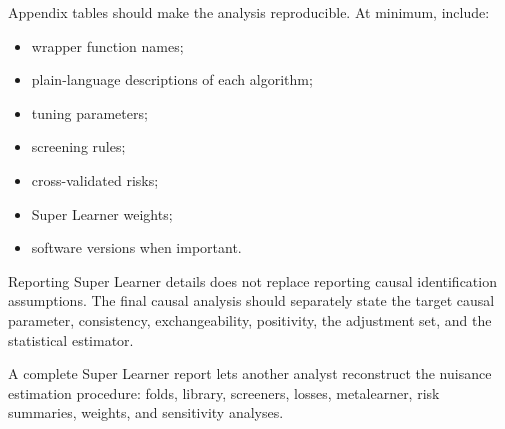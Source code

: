 Appendix tables should make the analysis reproducible. At minimum, include:
\begin{itemize}
\item wrapper function names;
\item plain-language descriptions of each algorithm;
\item tuning parameters;
\item screening rules;
\item cross-validated risks;
\item Super Learner weights;
\item software versions when important.
\end{itemize}

\begin{assumptionbox}
Reporting Super Learner details does not replace reporting causal identification
assumptions. The final causal analysis should separately state the target causal
parameter, consistency, exchangeability, positivity, the adjustment set, and the
statistical estimator.
\end{assumptionbox}

\begin{estimationbox}
A complete Super Learner report lets another analyst reconstruct the nuisance
estimation procedure: folds, library, screeners, losses, metalearner, risk summaries,
weights, and sensitivity analyses.
\end{estimationbox}
